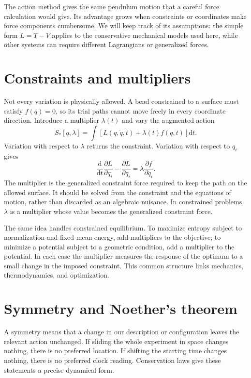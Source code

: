 \documentclass[11pt,oneside]{book}
\newcommand{\dd}{\mathrm{d}}
\newcommand{\pd}[2]{\frac{\partial #1}{\partial #2}}
\newcommand{\od}[2]{\frac{\dd #1}{\dd #2}}
\theoremstyle{reviewstyle}
\begin{document}
The action method gives the same pendulum motion that a careful force calculation would give. Its advantage grows when constraints or coordinates make force components cumbersome. We will keep track of its assumptions: the simple form $L=T-V$ applies to the conservative mechanical models used here, while other systems can require different Lagrangians or generalized forces.

\section{Constraints and multipliers}
Not every variation is physically allowed. A bead constrained to a surface must satisfy $f(q)=0$, so its trial paths cannot move freely in every coordinate direction. Introduce a multiplier $\lambda(t)$ and vary the augmented action
\begin{equation}
S_*[q,\lambda]=\int\left[L(q,\dot q,t)+\lambda(t)f(q,t)\right]\dd t.
\end{equation}
Variation with respect to $\lambda$ returns the constraint. Variation with respect to $q_i$ gives
\begin{equation}
\od{}{t}\pd{L}{\dot q_i}-\pd{L}{q_i}=\lambda\pd{f}{q_i}.
\end{equation}
The multiplier is the generalized constraint force required to keep the path on the allowed surface. It should be solved from the constraint and the equations of motion, rather than discarded as an algebraic nuisance. In constrained problems, $\lambda$ is a multiplier whose value becomes the generalized constraint force.

The same idea handles constrained equilibrium. To maximize entropy subject to normalization and fixed mean energy, add multipliers to the objective; to minimize a potential subject to a geometric condition, add a multiplier to the potential. In each case the multiplier measures the response of the optimum to a small change in the imposed constraint. This common structure links mechanics, thermodynamics, and optimization.

\section{Symmetry and Noether's theorem}
A symmetry means that a change in our description or configuration leaves the relevant action unchanged. If sliding the whole experiment in space changes nothing, there is no preferred location. If shifting the starting time changes nothing, there is no preferred clock reading. Conservation laws give these statements a precise dynamical form.
\end{document}
